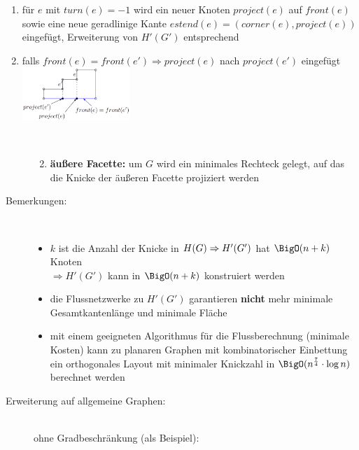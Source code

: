 \begin{description}
\begin{enumerate}
\begin{enumerate}
\begin{tabular}{rcl}
							\end{tabular}
						\item für $e$ mit $turn(e)=-1$ wird ein neuer Knoten $project(e)$ auf $front(e)$ sowie eine neue geradlinige Kante $estend(e)=(corner(e),project(e))$ eingefügt, Erweiterung von $H'(G')$ entsprechend
						\item falls $front(e)=front(e') \Rightarrow project(e)$  nach $project(e')$ eingefügt\\
						\includegraphics[height=2cm]{Pics/3_refinement-front.png}
					\end{enumerate}
		\end{enumerate}
\end{description}
\topbreak
\vspace*{-4\baselineskip}
\begin{description}
	\item[]\ \\
		\begin{enumerate}
		\setcounter{enumi}{1}
			\item \textbf{äußere Facette:} um $G$ wird ein minimales Rechteck gelegt, auf das die Knicke der äußeren Facette projiziert werden
		\end{enumerate}
	\item[Bemerkungen:]\ \\\vspace*{-\baselineskip}
		\begin{itemize}
			\item $k$ ist die Anzahl der Knicke in $H(G)\\
			\Rightarrow H'(G')$ hat $\BigO(n+k)$ Knoten\\
			$\Rightarrow H'(G')$ kann in $\BigO(n+k)$ konstruiert werden
			\item die Flussnetzwerke zu $H'(G')$ garantieren \textbf{nicht} mehr minimale Gesamtkantenlänge und minimale Fläche
			\item mit einem geeigneten Algorithmus für die Flussberechnung (minimale Kosten) kann zu planaren Graphen mit kombinatorischer Einbettung ein orthogonales Layout mit minimaler Knickzahl in $\BigO(n^{\frac{7}{4}}\cdot \log n)$ berechnet werden
		\end{itemize}
	\item[Erweiterung auf allgemeine Graphen:]\ \\\vspace*{-\baselineskip}
		ohne Gradbeschränkung (als Beispiel):\\
			
\end{description}